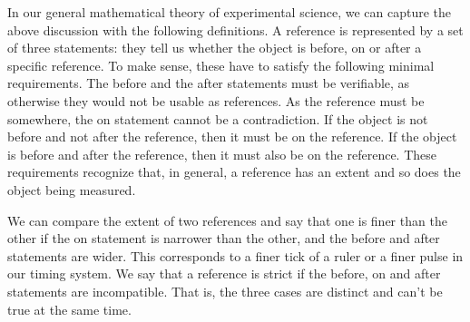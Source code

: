 \documentclass[11pt,letterpaper,fleqn]{memoir} %
\begin{document}
In our general mathematical theory of experimental science, we can capture the above discussion with the following definitions. A reference is represented by a set of three statements: they tell us whether the object is before, on or after a specific reference. To make sense, these have to satisfy the following minimal requirements. The before and the after statements must be verifiable, as otherwise they would not be usable as references. As the reference must be somewhere, the on statement cannot be a contradiction. If the object is not before and not after the reference, then it must be on the reference. If the object is before and after the reference, then it must also be on the reference. These requirements recognize that, in general, a reference has an extent and so does the object being measured.

We can compare the extent of two references and say that one is finer than the other if the on statement is narrower than the other, and the before and after statements are wider. This corresponds to a finer tick of a ruler or a finer pulse in our timing system. We say that a reference is strict if the before, on and after statements are incompatible. That is, the three cases are distinct and can't be true at the same time.
\end{document}
